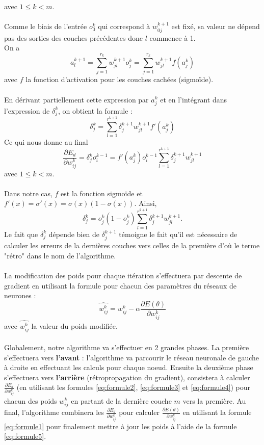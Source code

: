        avec $1\leq k < m$.\\
        \\Comme le biais de l'entrée $o^k_0$ qui correspond à $w^{k+1}_{0j}$ est fixé, sa valeur ne dépend pas des sorties des couches précédentes donc $l$ commence à 1.
        \\On a 
        $$
        a^{k+1}_l = \sum^{r_{k}}_{j=1}w^{k+1}_{jl}o^{k}_j=\sum^{r_{k}}_{j=1}w^{k+1}_{jl}f(a^k_j)
        $$
        avec $f$ la fonction d'activation pour les couches cachées (sigmoïde).\\
        \\
        En dérivant partiellement cette expression par $a^k_j$ et en l'intégrant dans l'expression de $\delta^k_j$, on obtient la formule :
        \begin{equation}
            \delta^k_j = \sum^{r^{k+1}}_{l=1}\delta^{k+1}_jw^{k+1}_{jl}f'(a^k_j)
            \label{eq:formule4}
        \end{equation}
        Ce qui nous donne au final
        $$
        \frac{\partial E_d}{\partial w_{ij}^k} = \delta^k_jo^{k-1}_i=f'(a^k_j)o^{k-1}_i\sum^{r^{k+1}}_{l=1}\delta^{k+1}_jw^{k+1}_{jl}
        $$
        avec $1\leq k < m$.\\\\
        Dans notre cas, $f$ est la fonction sigmoïde et $f'(x)=\sigma '(x) = \sigma (x)(1-\sigma(x))$.
        Ainsi, $$
        \delta^k_j = o^k_j(1-o^k_j)\sum^{r^{k+1}}_{l=1}\delta^{k+1}_jw^{k+1}_{jl}.
        $$
        Le fait que $\delta^k_j$ dépende bien de $\delta^{k+1}_j$ témoigne le fait qu'il est nécessaire de calculer les erreurs de la dernières couches vers celles de la première d'où le terme "rétro" dans le nom de l'algorithme.\\\\
        La modification des poids pour chaque itération s'effectuera par descente de gradient en utilisant la formule pour chacun des paramètres du réseaux de neurones : 
        \begin{equation}
           \hat{w^k_{ij}} = w^k_{ij} - \alpha \frac{\partial E(\theta)}{\partial w^k_{ij}}
           \label{eq:formule5}
        \end{equation}
        avec $\hat{w^k_{ij}}$ la valeur du poids modifiée.
        \\\\
        Globalement, notre algorithme va s'effectuer en 2 grandes phases. La première s'effectuera vers \textbf{l'avant} : l'algorithme va parcourir le réseau neuronale de gauche à droite en effectuant les calculs pour chaque noeud. Ensuite la deuxième phase s'effectuera vers \textbf{l'arrière} (rétropropagation du gradient), consistera à calculer $\frac{\partial E_d}{\partial w_{ij}^k}$ (en utilisant les formules \ref{eq:formule2}, \ref{eq:formule3} et \ref{eq:formule4}) pour chacun des poids $w^k_{ij}$ en partant de la dernière couche $m$ vers la première. Au final, l'algorithme combinera les $\frac{\partial E_d}{\partial w_{ij}^k}$ pour calculer $\frac{\partial E(\theta)}{\partial w^k_{ij}}$ en utilisant la formule \ref{eq:formule1} pour finalement mettre à jour les poids à l'aide de la formule \ref{eq:formule5}.
